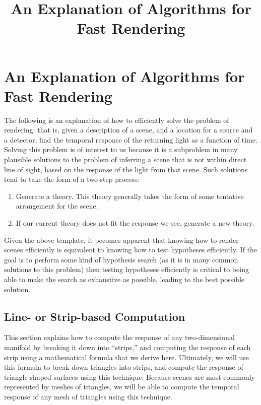 \documentclass[11pt]{article}
\title{An Explanation of Algorithms for Fast Rendering}
\begin{document}
\maketitle
    
\section{An Explanation of Algorithms for Fast Rendering}

The following is an explanation of how to efficiently solve the problem of rendering: that is, given a description of a scene, and a location for a source and a detector, find the temporal response of the returning light as a function of time. Solving this problem is of interest to us because it is a subproblem in many plausible solutions to the problem of inferring a scene that is not within direct line of sight, based on the response of the light from that scene. Such solutions tend to take the form of a two-step process:

\begin{enumerate}

\item Generate a theory. This theory generally takes the form of some tentative arrangement for the scene. 
\item If our current theory does not fit the response we see, generate a new theory. 

\end{enumerate}

Given the above template, it becomes apparent that knowing how to render scenes efficiently is equivalent to knowing how to test hypotheses efficiently. If the goal is to perform some kind of hypothesis search (as it is in many common solutions to this problem\footnotemark) then testing hypotheses efficiently is critical to being able to make the search as exhaustive as possible, leading to the best possible solution.

\subsection{Line- or Strip-based Computation}

This section explains how to compute the response of any two-dimensional manifold by breaking it down into ``strips,'' and computing the response of each strip using a mathematical formula that we derive here. Ultimately, we will use this formula to break down triangles into strips, and compute the response of triangle-shaped surfaces using this technique. Because scenes are most commonly represented by meshes of triangles, we will be able to compute the temporal response of any mesh of triangles using this technique.
\end{document}
